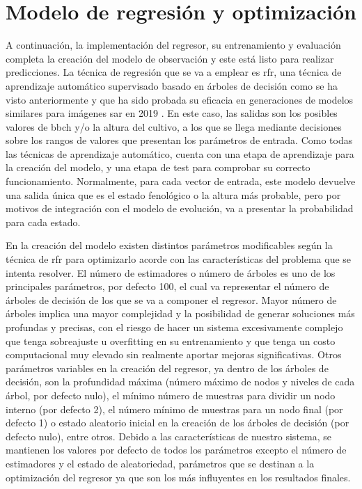 \section{Modelo de regresión y optimización}
\par A continuación, la implementación del regresor, su entrenamiento y evaluación completa la creación del modelo de observación y este está listo para realizar predicciones. La técnica de regresión que se va a emplear es \gls{rfr}, una técnica de aprendizaje automático supervisado basado en árboles de decisión como se ha visto anteriormente y que ha sido probada su eficacia en generaciones de modelos similares para imágenes \gls{sar} en 2019 \cite{artRF}. En este caso, las salidas son los posibles valores de \gls{bbch} y/o la altura del cultivo, a los que se llega mediante decisiones sobre los rangos de valores que presentan los parámetros de entrada. Como todas las técnicas de aprendizaje automático, cuenta con una etapa de aprendizaje para la creación del modelo, y una etapa de test para comprobar su correcto funcionamiento. Normalmente, para cada vector de entrada, este modelo devuelve una salida única que es el estado fenológico o la altura más probable, pero por motivos de integración con el modelo de evolución, va a presentar la probabilidad para cada estado. 
\\
\par En la creación del modelo existen distintos parámetros modificables según la técnica de \gls{rfr} para optimizarlo acorde con las características del problema que se intenta resolver. El número de estimadores o número de árboles es uno de los principales parámetros, por defecto 100, el cual va representar el número de árboles de decisión de los que se va a componer el regresor. Mayor número de árboles implica una mayor complejidad y la posibilidad de generar soluciones más profundas y precisas, con el riesgo de hacer un sistema excesivamente complejo que tenga sobreajuste u overfitting en su entrenamiento y que tenga un costo computacional muy elevado sin realmente aportar mejoras significativas. Otros parámetros variables en la creación del regresor, ya dentro de los árboles de decisión, son la profundidad máxima (número máximo de nodos y niveles de cada árbol, por defecto nulo), el mínimo número de muestras para dividir un nodo interno (por defecto 2), el número mínimo de muestras para un nodo final (por defecto 1) o estado aleatorio inicial en la creación de los árboles de decisión (por defecto nulo), entre otros. Debido a las características de nuestro sistema, se mantienen los valores por defecto de todos los parámetros excepto el número de estimadores y el estado de aleatoriedad, parámetros que se destinan a la optimización del regresor ya que son los más influyentes en los resultados finales. 
